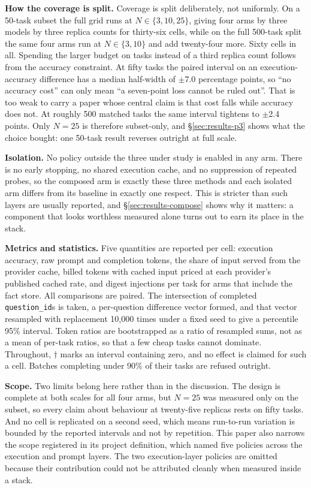 \documentclass[conference]{IEEEtran}
\begin{document}
\textbf{How the coverage is split.} Coverage is split deliberately, not uniformly. On a
50-task subset the full grid runs at $N \in \{3, 10, 25\}$, giving four arms by
three models by three replica counts for thirty-six cells, while on the full
500-task split the same four arms run at $N \in \{3, 10\}$ and add twenty-four
more. Sixty cells in all. Spending the larger budget on tasks instead of a third replica count
follows from the accuracy constraint. At fifty tasks the paired interval on an
execution-accuracy difference has a median half-width of $\pm$7.0 percentage
points, so ``no accuracy cost'' can only mean ``a seven-point loss cannot be
ruled out''. That is too weak to carry a paper whose central claim is that cost
falls while accuracy does not. At roughly 500 matched tasks the same interval
tightens to $\pm$2.4 points. Only $N = 25$ is therefore subset-only, and
§\ref{sec:results-p3} shows what the choice bought: one 50-task result reverses
outright at full scale.

\textbf{Isolation.} No policy outside the three under study is enabled in any
arm. There is no early stopping, no shared execution cache, and no suppression of
repeated probes, so the composed arm is exactly these three methods and each
isolated arm differs from its baseline in exactly one respect. This is
stricter than such layers are usually reported, and §\ref{sec:results-compose}
shows why it matters: a component that looks worthless measured alone turns out
to earn its place in the stack.

\textbf{Metrics and statistics.} Five quantities are reported per cell:
execution accuracy, raw prompt and completion tokens, the share of input served
from the provider cache, billed tokens with cached input priced at each
provider's published cached rate, and digest injections per task for arms that
include the fact store. All comparisons are paired. The intersection of completed
\texttt{question\_id}s is taken, a per-question difference vector formed, and
that vector resampled with replacement 10{,}000 times under a fixed seed to give
a percentile 95\% interval. Token ratios are bootstrapped as a ratio of
resampled sums, not as a mean of per-task ratios, so that a few cheap tasks
cannot dominate. Throughout, $\dag$ marks an interval containing zero, and no
effect is claimed for such a cell. Batches completing under 90\% of their tasks
are refused outright.

\textbf{Scope.} Two limits belong here rather than in the discussion. The design
is complete at both scales for all four arms, but $N = 25$ was measured only on
the subset, so every claim about behaviour at twenty-five replicas rests on
fifty tasks. And no cell is replicated on a second seed, which means run-to-run
variation is bounded by the reported intervals and not by repetition. This paper also narrows the scope registered in its project definition, which
named five policies across the execution and prompt layers. The two
execution-layer policies are omitted because their contribution could not be
attributed cleanly when measured inside a stack.
\end{document}
